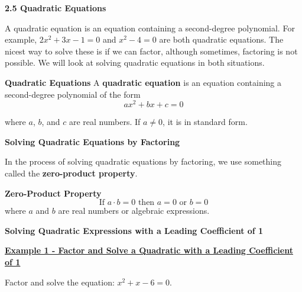 \documentclass[12pt]{book}
\begin{document}
\textbf{{\Large 2.5 Quadratic Equations}}
\vspace{5mm}

A quadratic equation is an equation containing a second-degree polynomial. For example, $2x^2+3x-1 = 0$ and $x^2-4=0$ are both quadratic equations. The nicest way to solve these is if we can factor, although sometimes, factoring is not possible. We will look at solving quadratic equations in both situations.

\vspace{3mm}
  \begin{boxR}
     \textbf{Quadratic Equations}
    \vspace{1mm}
    \hline
    \vspace{2mm}
A \textbf{quadratic equation} is an equation containing a second-degree polynomial of the form $$ax^2+bx+c=0$$
 
where $a$, $b$, and $c$ are real numbers. If $a \neq 0$, it is in standard form.
\end{boxR}
\vspace{3mm}
{\large \textbf{Solving Quadratic Equations by Factoring}}

In the process of solving quadratic equations by factoring, we use something called the \textbf{zero-product property}.
\vspace{3mm}
    \begin{boxR}
     \textbf{Zero-Product Property}
    \vspace{1mm}
    \hline
    \vspace{2mm}
    $$ \text{If } a \cdot b = 0 \text{ then } a=0 \text{ or } b=0$$
     where $a$ and $b$ are real numbers or algebraic expressions.  
\end{boxR}
\vspace{3mm}

\textbf{Solving Quadratic Expressions with a Leading Coefficient of 1}
\vspace{3mm}

\underline{\textbf{Example 1 - Factor and Solve a Quadratic with a Leading Coefficient of 1}}

Factor and solve the equation: $x^2 + x -6 = 0$.

\newpage
\end{document}
